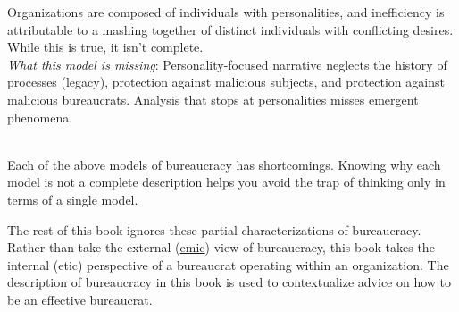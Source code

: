 Organizations are composed of individuals with personalities, and inefficiency is attributable to a mashing together of distinct individuals with conflicting desires.
While this is true, it isn't complete. \\
\textit{What this model is missing}: Personality-focused narrative neglects the history of processes (legacy), protection against malicious subjects, and protection against malicious bureaucrats. Analysis that stops at personalities misses emergent phenomena. %

\ \\

Each of the above models of bureaucracy has shortcomings. Knowing why each model is not a complete description helps you avoid the trap of thinking only in terms of a single model. 

The rest of this book ignores these partial characterizations of bureaucracy. 
Rather than take the external (\href{https://en.wikipedia.org/wiki/Emic_and_etic}{emic}) 
view of bureaucracy, this book takes the internal (etic) perspective of a bureaucrat operating within an organization. 
The description of bureaucracy in this book is used to contextualize advice on how to be an effective bureaucrat. 